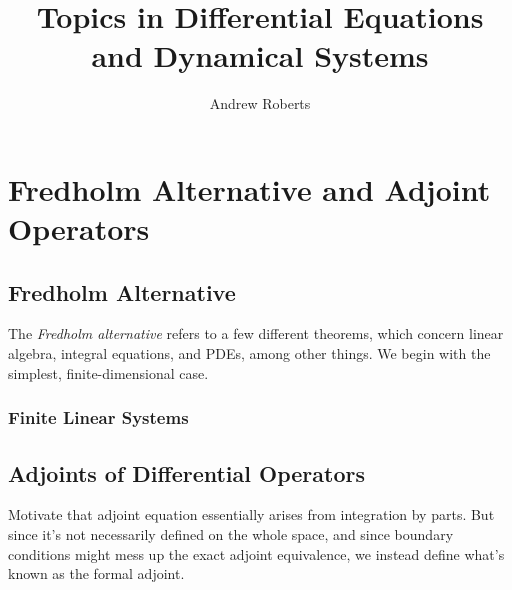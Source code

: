 \documentclass[12pt]{article}
\title{Topics in Differential Equations and Dynamical Systems}
\author{Andrew Roberts}
\begin{document}
\maketitle
\tableofcontents
\newpage

\section{Fredholm Alternative and Adjoint Operators}

\subsection{Fredholm Alternative}
The \textit{Fredholm alternative} refers to a few different theorems, which concern linear algebra, integral equations, and PDEs, among other things. 
We begin with the simplest, finite-dimensional case. 

\subsubsection{Finite Linear Systems}

\subsection{Adjoints of Differential Operators}
Motivate that adjoint equation essentially arises from integration by parts. But since it's not necessarily defined on the whole space, and since 
boundary conditions might mess up the exact adjoint equivalence, we instead define what's known as the formal adjoint. 

\end{document}
